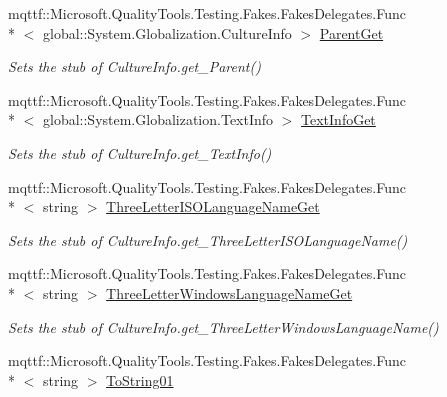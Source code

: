 \begin{DoxyCompactItemize}
mqttf\-::\-Microsoft.\-Quality\-Tools.\-Testing.\-Fakes.\-Fakes\-Delegates.\-Func\\*
$<$ global\-::\-System.\-Globalization.\-Culture\-Info $>$ \hyperlink{class_system_1_1_globalization_1_1_fakes_1_1_stub_culture_info_a3ce91e2a2d535938e672c202e5d4b726}{Parent\-Get}
\begin{DoxyCompactList}\small\item\em Sets the stub of Culture\-Info.\-get\-\_\-\-Parent()\end{DoxyCompactList}\item 
mqttf\-::\-Microsoft.\-Quality\-Tools.\-Testing.\-Fakes.\-Fakes\-Delegates.\-Func\\*
$<$ global\-::\-System.\-Globalization.\-Text\-Info $>$ \hyperlink{class_system_1_1_globalization_1_1_fakes_1_1_stub_culture_info_a1c78d61337ad755e7269a89001065bbd}{Text\-Info\-Get}
\begin{DoxyCompactList}\small\item\em Sets the stub of Culture\-Info.\-get\-\_\-\-Text\-Info()\end{DoxyCompactList}\item 
mqttf\-::\-Microsoft.\-Quality\-Tools.\-Testing.\-Fakes.\-Fakes\-Delegates.\-Func\\*
$<$ string $>$ \hyperlink{class_system_1_1_globalization_1_1_fakes_1_1_stub_culture_info_afa1187538e50496d591fccb15e34e6b6}{Three\-Letter\-I\-S\-O\-Language\-Name\-Get}
\begin{DoxyCompactList}\small\item\em Sets the stub of Culture\-Info.\-get\-\_\-\-Three\-Letter\-I\-S\-O\-Language\-Name()\end{DoxyCompactList}\item 
mqttf\-::\-Microsoft.\-Quality\-Tools.\-Testing.\-Fakes.\-Fakes\-Delegates.\-Func\\*
$<$ string $>$ \hyperlink{class_system_1_1_globalization_1_1_fakes_1_1_stub_culture_info_af449ba01a9b19ec4127118114e909290}{Three\-Letter\-Windows\-Language\-Name\-Get}
\begin{DoxyCompactList}\small\item\em Sets the stub of Culture\-Info.\-get\-\_\-\-Three\-Letter\-Windows\-Language\-Name()\end{DoxyCompactList}\item 
mqttf\-::\-Microsoft.\-Quality\-Tools.\-Testing.\-Fakes.\-Fakes\-Delegates.\-Func\\*
$<$ string $>$ \hyperlink{class_system_1_1_globalization_1_1_fakes_1_1_stub_culture_info_a674f1775b9f91b129ea87daff624b282}{To\-String01}

\end{DoxyCompactItemize}
